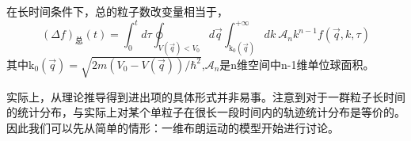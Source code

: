 在长时间条件下，总的粒子数改变量相当于，
\begin{equation}
  \left( \Delta f \right) _{\text{总}}\left( t \right) =\int_0^t{d\tau \oint_{V\left( \vec{q} \right) <V_0}{d\vec{q}\int_{\mathrm{k}_{0}\left( \vec{q} \right)}^{+\infty}{dk\ \mathcal{A}_nk^{n-1}f\left( \vec{q},k,\tau \right)}}}
\end{equation}
其中$\mathrm{k}_{0}(\vec{q}) = \sqrt{2m(V_0-V(\vec{q}))/\hbar^2}$,$\mathcal{A}_n$是n维空间中n-1维单位球面积。

实际上，从理论推导得到进出项的具体形式并非易事。注意到对于一群粒子长时间的统计分布，与实际上对某个单粒子在很长一段时间内的轨迹统计分布是等价的。因此我们可以先从简单的情形：一维布朗运动的模型开始进行讨论。

